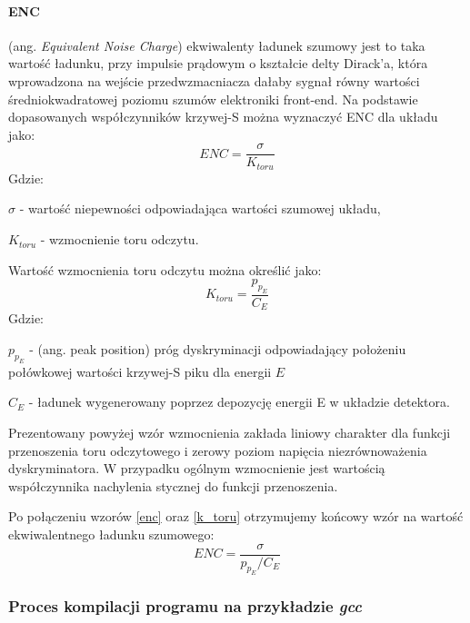 \paragraph{ENC}
 (ang. \textit{Equivalent Noise Charge}) ekwiwalenty ładunek szumowy jest to taka wartość ładunku, przy impulsie prądowym o kształcie delty Dirack'a, która wprowadzona na wejście przedwzmacniacza dałaby sygnał równy wartości średniokwadratowej poziomu szumów elektroniki front-end. Na podstawie dopasowanych współczynników krzywej-S można wyznaczyć ENC dla układu jako: 
 \begin{equation}
        \label{enc}
         ENC = \frac{\sigma}{K_{toru}}
 \end{equation}
 Gdzie:
 \begin{description}
        \item  $\sigma$ - wartość niepewności odpowiadająca wartości szumowej układu, 
        \item $K_{toru}$ - wzmocnienie toru odczytu.
 \end{description}
 
\noindent
Wartość wzmocnienia toru odczytu można określić jako:
\begin{equation}
        \label{k_toru}
        K_{toru} = \frac{p_{p_E}}{C_E}
\end{equation}
Gdzie:
\begin{description}
        \item  $p_{p_E}$ - (ang. peak position) próg dyskryminacji odpowiadający położeniu połówkowej wartości krzywej-S piku dla energii $E$
        \item  $C_E$ - ładunek wygenerowany poprzez depozycję energii E w układzie detektora.
\end{description}

Prezentowany powyżej wzór wzmocnienia zakłada liniowy charakter dla funkcji przenoszenia toru odczytowego i zerowy poziom napięcia niezrównoważenia dyskryminatora. W przypadku ogólnym wzmocnienie jest wartością współczynnika nachylenia stycznej do funkcji przenoszenia.

Po połączeniu wzorów \ref{enc} oraz \ref{k_toru} otrzymujemy końcowy wzór na wartość ekwiwalentnego ładunku szumowego:
\begin{equation}
        ENC = \frac{\sigma}{p_{p_E}/C_E}
\end{equation}


\subsubsection{Proces kompilacji programu na przykładzie \textit{gcc}}

